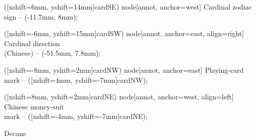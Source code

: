 \documentclass{article}
\begin{document}
\begin{center}
{  %
    ([xshift=6mm, yshift=14mm]cardSE) node[annot, anchor=west] {Cardinal zodiac sign}
    -- (-11.7mm, 8mm);

    ([xshift=-6mm, yshift=15mm]cardSW) node[annot, anchor=east, align=right] {Cardinal direction\\(Chinese)}
    -- (-51.5mm, 7.8mm);

    ([xshift=-8mm, yshift=2mm]cardNW) node[annot, anchor=east] {Playing-card mark}
    -- ([xshift=4mm, yshift=-7mm]cardNW);

    ([xshift=8mm, yshift=2mm]cardNE) node[annot, anchor=west, align=left] {Chinese money-suit\\mark}
    -- ([xshift=-4mm, yshift=-7mm]cardNE);
}
\end{center}

\restoregeometry
\newpage


\begin{center}
{\cardfont\fontsize{18}{22} Decans}
\end{center}

\vspace{2mm}
\end{document}
